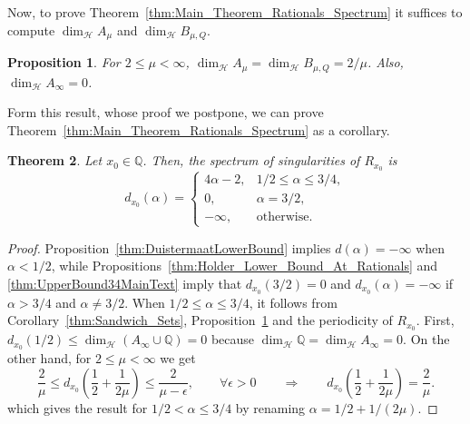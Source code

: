 \documentclass[11pt,reqno]{amsart}
\newtheorem{thm}{Theorem}[section]
\newtheorem{prop}[thm]{Proposition}
\theoremstyle{definition}
\begin{document}
Now, to prove Theorem~\ref{thm:Main_Theorem_Rationals_Spectrum}
it suffices to compute $\operatorname{dim}_{\mathcal H}  A_\mu$ and $\operatorname{dim}_{\mathcal H}  B_{\mu,Q}$.  
\begin{prop}\label{thm:Dimensions}
For  $2 \leq \mu < \infty$,  
$\operatorname{dim}_{\mathcal H} A_\mu 
= \operatorname{dim}_{\mathcal H} B_{\mu,Q}
= 2/\mu$. 
Also, $\operatorname{dim}_{\mathcal H} A_\infty = 0$. 
\end{prop}
Form this result, whose proof we postpone, we can prove 
Theorem~\ref{thm:Main_Theorem_Rationals_Spectrum}
as a corollary.
\begin{thm}\label{thm:Spectrum_Rationals}
Let $x_0 \in \mathbb Q$. Then, the spectrum of singularities of $R_{x_0}$ is
\begin{equation}
d_{x_0}(\alpha) = 
\left\{
\begin{array}{ll}
4  \alpha - 2, & 1/2 \leq \alpha \leq 3/4, \\
0, & \alpha = 3/2, \\
-\infty, & \text{otherwise.}
\end{array} \right.
\end{equation}
\end{thm}
\begin{proof}
Proposition~\ref{thm:DuistermaatLowerBound} implies $d(\alpha) = -\infty$ when $\alpha < 1/2$, while Propositions~\ref{thm:Holder_Lower_Bound_At_Rationals} and \ref{thm:UpperBound34MainText} imply that $d_{x_0}(3/2) = 0$ and $d_{x_0}(\alpha) = -\infty$ if $\alpha > 3/4$ and $\alpha \neq 3/2$.
When $1/2 \leq \alpha \leq 3/4$, 
it follows from
Corollary~\ref{thm:Sandwich_Sets}, Proposition~\ref{thm:Dimensions} and the periodicity of $R_{x_0}$. 
First, 
$d_{x_0}(1/2) \leq  \operatorname{dim}_{\mathcal H} ( A_\infty \cup \mathbb Q ) = 0$
because $\operatorname{dim}_{\mathcal H} \mathbb Q = \operatorname{dim}_{\mathcal H}  A_\infty = 0$. 
On the other hand, for  $2 \leq \mu < \infty$ we get
\begin{equation}
\frac{2}{\mu} \leq 
d_{x_0} \left( \frac12 + \frac{1}{2\mu} \right) \leq \frac{2}{\mu - \epsilon},  \qquad \forall \epsilon > 0 
\qquad \Longrightarrow \qquad
d_{x_0}\left( \frac12 + \frac{1}{2\mu} \right) = \frac{2}{\mu}. 
\end{equation}
which gives the result for $1/2 < \alpha \leq 3/4$ by renaming $\alpha =  1/2 + 1/(2\mu)$.
\end{proof}
\end{document}
